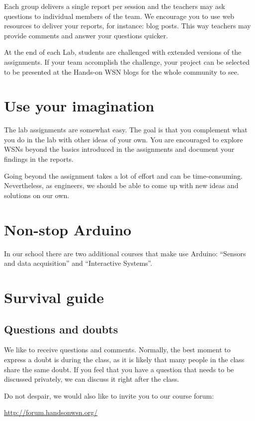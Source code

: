 	Each group delivers a single report per session and the teachers may ask questions to individual members of the team.
	We encourage you to use web resources to deliver your reports, for instance: blog posts. This way teachers may provide comments and answer your questions quicker.
	
	At the end of each Lab, students are challenged with extended versions of the assignments. If your team accomplish the challenge, your project can be selected to be presented at the Hands-on WSN blogs for the whole community to see.


\section{Use your imagination}
The lab assignments are somewhat easy.
The goal is that you complement what you do in the lab with other ideas of your own.
You are encouraged to explore WSNs beyond the basics introduced in the assignments and document your findings in the reports.

Going beyond the assignment takes a lot of effort and can be time-consuming.
Nevertheless, as engineers, we should be able to come up with new ideas and solutions on our own.

\section{Non-stop Arduino}
In our school there are two additional courses that make use Arduino: ``Sensors and data acquisition'' and ``Interactive Systems''.

\section{Survival guide}

\subsection{Questions and doubts}
We like to receive questions and comments.
Normally, the best moment to express a doubt is during the class, as it is likely that many people in the class share the same doubt.
If you feel that you have a question that needs to be discussed privately, we can discuss it right after the class.

Do not despair, we would also like to invite you to our course forum:

\url{http://forum.handsonwsn.org/}

